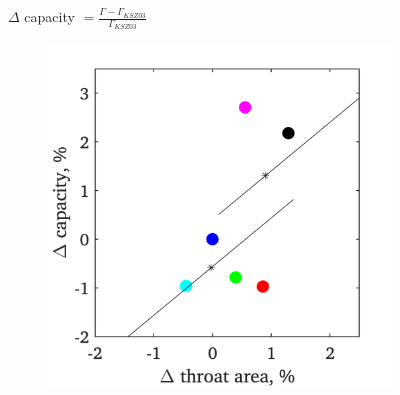 \documentclass[a4paper, 11pt, oneside]{report}
\begin{document}
\begin{figure}[H]
	\centering
	$\Delta$ capacity $= \frac{\Gamma - \Gamma_{KSZ03}}{\Gamma_{KSZ03}}$
	\hspace{0.45cm}
	\begin{subfigure}{.45\textwidth}
		\centering
		\includegraphics[width=\linewidth]{figs/T900_3d_capacities_vs_throat_areas.png}
	\end{subfigure}
	\begin{subfigure}{.1125\textwidth}
		\centering

\end{subfigure}
\end{figure}
\end{document}
